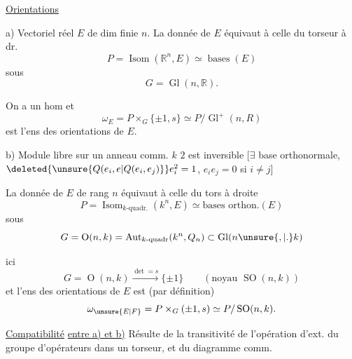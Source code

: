 \uline{Orientations}

a) Vectoriel réel $E$ de dim finie $n$. La donnée de $E$ équivaut à celle du torseur à dr.
\[
 P=\operatorname{Isom}(\mathbb R^n,E)\simeq\operatorname{bases}(E)
\]
sous
\[
 G=\operatorname{Gl}(n,\mathbb R).
\]

On a un hom
et
\[
 \omega_E=P\times_G\{\pm1,s\}\simeq P/\operatorname{Gl}^+(n,R)
\]
est l'ens des orientations de $E$.

b) Module  libre   sur un anneau comm. $k$  $2$ est inversible [$\exists$ base orthonormale, $\deleted{\unsure{Q(e_i,e|Q(e_i,e_j)}} e_i^2=1$, $e_i e_j=0$ si $i\ne j$]

La donnée de $E$ de rang $n$ équivaut à celle du tors à droite
\[
 P=\operatorname{Isom}_{k\text{-quadr.}}(k^n,E)\simeq\text{bases orthon.}(E)
\]
sous
\[
 G=\operatorname{O}(n,k)=\operatorname{Aut}_{k\text{-quadr}}(k^n,Q_n)\subset\operatorname{Gl}(n\unsure{,|.}k)
\]

 ici
\[
 G=\operatorname{O}(n,k)\xrightarrow{\det=s}\{\pm1\}\qquad(\text{noyau }\operatorname{SO}(n,k))
\]
et l'ens des orientations de $E$ est (par définition)
\[
 \omega_{\unsure{E|F}}=P\times_G(\pm1,s)\simeq P/\operatorname{SO}(n,k).
\]

\uline{Compatibilité} \uline{entre a) et b)} Résulte de la transitivité de l'opération d'ext. du groupe d'opérateurs dans un torseur, et du diagramme comm.
